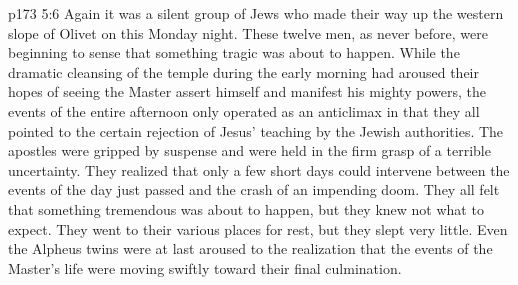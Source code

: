 \vs p173 5:6 Again it was a silent group of Jews who made their way up the western slope of Olivet on this Monday night. These twelve men, as never before, were beginning to sense that something tragic was about to happen. While the dramatic cleansing of the temple during the early morning had aroused their hopes of seeing the Master assert himself and manifest his mighty powers, the events of the entire afternoon only operated as an anticlimax in that they all pointed to the certain rejection of Jesus’ teaching by the Jewish authorities. The apostles were gripped by suspense and were held in the firm grasp of a terrible uncertainty. They realized that only a few short days could intervene between the events of the day just passed and the crash of an impending doom. They all felt that something tremendous was about to happen, but they knew not what to expect. They went to their various places for rest, but they slept very little. Even the Alpheus twins were at last aroused to the realization that the events of the Master’s life were moving swiftly toward their final culmination.

